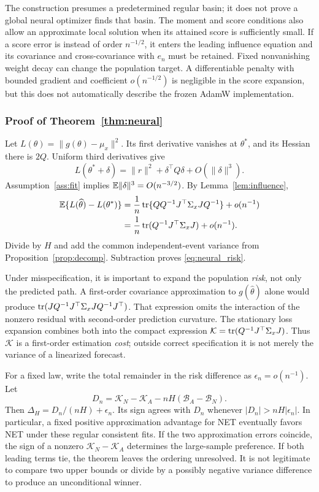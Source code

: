 The construction presumes a predetermined regular basin; it does not prove a global neural optimizer finds that basin. The moment and score conditions also allow an approximate local solution when its attained score is sufficiently small. If a score error is instead of order $n^{-1/2}$, it enters the leading influence equation and its covariance and cross-covariance with $e_n$ must be retained. Fixed nonvanishing weight decay can change the population target. A differentiable penalty with bounded gradient and coefficient $o(n^{-1/2})$ is negligible in the score expansion, but this does not automatically describe the frozen AdamW implementation.

\subsubsection{Proof of Theorem~\ref{thm:neural}}
Let $L(\theta)=\|g(\theta)-\mu_x\|^2$. Its first derivative vanishes at $\theta^*$, and its Hessian there is $2Q$. Uniform third derivatives give
\[
 L(\theta^*+\delta)
 =\|r\|^2+\delta^\top Q\delta+O(\|\delta\|^3).
\]
Assumption~\ref{ass:fit} implies $\mathbb E\|\delta\|^3=O(n^{-3/2})$. By Lemma~\ref{lem:influence},
\begin{align*}
 \mathbb E\{L(\widehat\theta)-L(\theta^*)\}
 &=\frac1n\operatorname{tr}\{Q Q^{-1}J^\top\Sigma_xJQ^{-1}\}+o(n^{-1})\\
 &=\frac1n\operatorname{tr}(Q^{-1}J^\top\Sigma_xJ)+o(n^{-1}).
\end{align*}
Divide by $H$ and add the common independent-event variance from Proposition~\ref{prop:decomp}. Subtraction proves \eqref{eq:neural_risk}.

Under misspecification, it is important to expand the population \emph{risk}, not only the predicted path. A first-order covariance approximation to $g(\widehat\theta)$ alone would produce $\operatorname{tr}(JQ^{-1}J^\top\Sigma_xJQ^{-1}J^\top)$. That expression omits the interaction of the nonzero residual with second-order prediction curvature. The stationary loss expansion combines both into the compact expression $\mathcal K=\operatorname{tr}(Q^{-1}J^\top\Sigma_xJ)$. Thus $\mathcal K$ is a first-order estimation \emph{cost}; outside correct specification it is not merely the variance of a linearized forecast.

For a fixed law, write the total remainder in the risk difference as $\epsilon_n=o(n^{-1})$. Let
\[
 D_n=\mathcal K_N-\mathcal K_A-nH(\mathcal B_A-\mathcal B_N).
\]
Then $\Delta_H=D_n/(nH)+\epsilon_n$. Its sign agrees with $D_n$ whenever $|D_n|>nH|\epsilon_n|$. In particular, a fixed positive approximation advantage for NET eventually favors NET under these regular consistent fits. If the two approximation errors coincide, the sign of a nonzero $\mathcal K_N-\mathcal K_A$ determines the large-sample preference. If both leading terms tie, the theorem leaves the ordering unresolved. It is not legitimate to compare two upper bounds or divide by a possibly negative variance difference to produce an unconditional winner.

